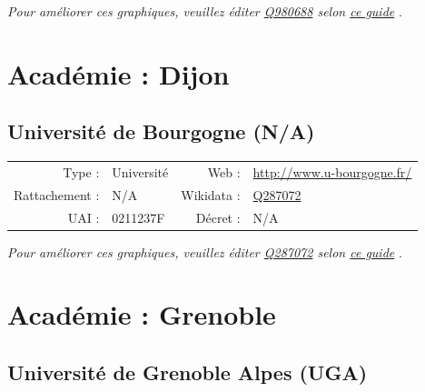 \documentclass[12pt,french,landscape]{article}
\begin{document}
\textit{\scriptsize Pour améliorer ces graphiques, veuillez éditer \href{https://www.wikidata.org/entity/Q980688}{Q980688}  selon \href{https://github.com/cpesr/wikidataESR/blob/master/Rmd/wikidataESR.md}{ce guide}}
.


\newpage

\hypertarget{acaduxe9mie-dijon}{%
\section{Académie : Dijon}\label{acaduxe9mie-dijon}}

\hypertarget{universituxe9-de-bourgogne-na}{%
\subsection{Université de Bourgogne
(N/A)}\label{universituxe9-de-bourgogne-na}}

\begin{tabular*}{0.45\textwidth}{rp{2cm}rl}  
\hline  
Type : & Université & Web : &\href{http://www.u-bourgogne.fr/}{http://www.u-bourgogne.fr/} \\  
Rattachement : & N/A & Wikidata : & \href{https://www.wikidata.org/entity/Q287072}{Q287072} \\  
UAI : & 0211237F & Décret : & N/A \\  
\hline  
\end{tabular*}

\textit{\scriptsize Pour améliorer ces graphiques, veuillez éditer \href{https://www.wikidata.org/entity/Q287072}{Q287072}  selon \href{https://github.com/cpesr/wikidataESR/blob/master/Rmd/wikidataESR.md}{ce guide}}
.


\newpage

\hypertarget{acaduxe9mie-grenoble}{%
\section{Académie : Grenoble}\label{acaduxe9mie-grenoble}}

\hypertarget{universituxe9-de-grenoble-alpes-uga}{%
\subsection{Université de Grenoble Alpes
(UGA)}\label{universituxe9-de-grenoble-alpes-uga}}
\end{document}
